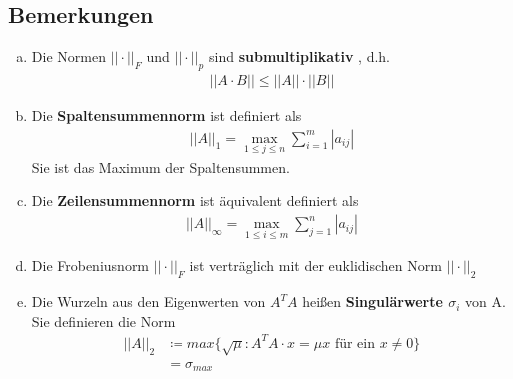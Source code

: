 \documentclass[ngerman,fontsize=11pt, paper=a4, parskip=false, titlepage=false, toc=bib]{scrbook}
\begin{document}
\subsection{Bemerkungen} \label{3.2.6}
\begin{enumerate}[a)]
	\item Die Normen $||\cdot||_F$ und $||\cdot||_p$ sind \textbf{submultiplikativ} , d.h.
				\begin{gather*}
					||A\cdot B|| \leq ||A|| \cdot ||B||
				\end{gather*}
	\item Die \textbf{Spaltensummennorm} ist definiert als
				\begin{gather*}
					||A||_1 = \max_{1\leq j \leq n}\sum_{i=1}^{m}|a_{ij}|
				\end{gather*}
			Sie ist das Maximum der Spaltensummen.
	\item Die \textbf{Zeilensummennorm} ist äquivalent definiert als
				\begin{gather*}
					||A||_\infty = \max_{1\leq i \leq m}\sum_{j=1}^{n}|a_{ij}|
				\end{gather*}
	\item Die Frobeniusnorm $||\cdot||_F$ ist verträglich mit der euklidischen Norm $||\cdot||_2$
	\item Die Wurzeln aus den Eigenwerten von $A^TA$ heißen \textbf{Singulärwerte $\sigma_i$}  von A. Sie definieren die Norm
				\begin{align*}
					||A||_2 &\coloneqq max \{\sqrt{\mu} : A^TA\cdot x = \mu x\text{ für ein }x\neq 0 \} \\
								& = \sigma_{max}
				\end{align*}
\end{enumerate}

 \label{3.2a}\vspace{1eM}
\end{document}
